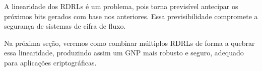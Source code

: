 A linearidade dos RDRLs é um problema, pois torna previsível antecipar os próximos bits gerados com base nos anteriores.
Essa previsibilidade compromete a segurança de sistemas de cifra de fluxo.

Na próxima seção, veremos como combinar múltiplos RDRLs de forma a quebrar essa linearidade, produzindo assim um GNP mais robusto e seguro, adequado para aplicações criptográficas.






